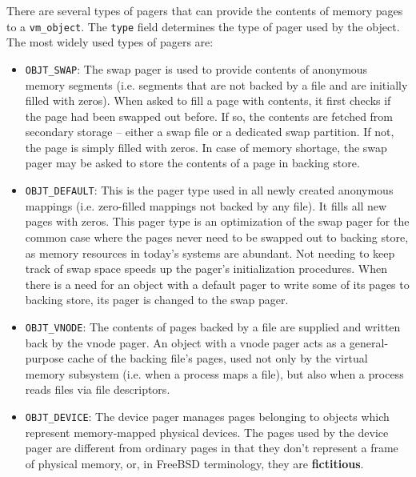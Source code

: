\documentclass[shortabstract, english]{iithesis}
\begin{document}
There are several types of pagers that can provide the contents of memory pages
to a \texttt{vm_object}. The \texttt{type} field determines the
type of pager used by the object. The most widely used types of pagers are:

\begin{itemize}

\item \texttt{OBJT_SWAP}: The swap pager is used to provide contents of
  anonymous memory segments (i.e. segments that are not backed by a file and are
  initially filled with zeros). When asked to fill a page with contents, it
  first checks if the page had been swapped out before. If so, the contents are
  fetched from secondary storage -- either a swap file or a dedicated swap
  partition. If not, the page is simply filled with zeros. In case of memory
  shortage, the swap pager may be asked to store the contents of a page in
  backing store.

\item \texttt{OBJT_DEFAULT}: This is the pager type used in all newly
  created anonymous mappings (i.e. zero-filled mappings not backed by any file).
  It fills all new pages with zeros. This pager type is an optimization of the
  swap pager for the common case where the pages never need to be swapped out to
  backing store, as memory resources in today's systems are abundant. Not
  needing to keep track of swap space speeds up the pager's initialization
  procedures. When there is a need for an object with a default pager to write
  some of its pages to backing store, its pager is changed to the swap pager.

\item \texttt{OBJT_VNODE}: The contents of pages backed by a file are
  supplied and written back by the vnode pager. An object with a vnode pager
  acts as a general-purpose cache of the backing file's pages, used not only by
  the virtual memory subsystem (i.e. when a process maps a file), but also when
  a process reads files via file descriptors.

\item \texttt{OBJT_DEVICE}: The device pager manages pages belonging to
  objects which represent memory-mapped physical devices. The pages used by the
  device pager are different from ordinary pages in that they don't represent a
  frame of physical memory, or, in FreeBSD terminology, they are
  \textbf{fictitious}.
\end{itemize}
\end{document}
